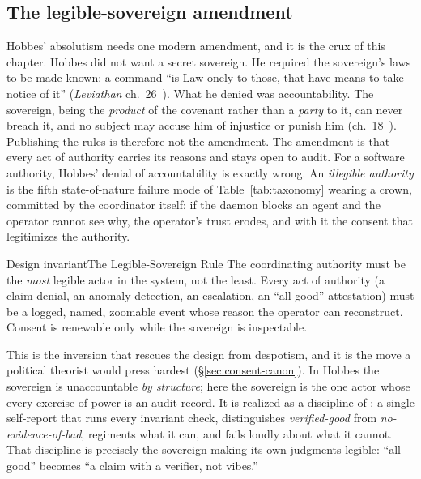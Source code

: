 \documentclass[11pt,a4paper]{article}
\theoremstyle{definition}
\theoremstyle{plain}
\begin{document}
\subsection{The legible-sovereign amendment}\label{sec:legible-sovereign}
Hobbes' absolutism needs one modern amendment, and it is the crux of this chapter.
Hobbes did not want a secret sovereign. He required the sovereign's laws to be made
known: a command ``is Law onely to those, that have means to take notice of it''
(\emph{Leviathan} ch.~26~). What he denied was accountability.
The sovereign, being the \emph{product} of the covenant rather than a
\emph{party} to it, can never breach it, and no subject may accuse him of
injustice or punish him (ch.~18~). Publishing the
rules is therefore not the amendment. The amendment is that every act of
authority carries its reasons and stays open to audit. For a software
authority, Hobbes' denial of accountability is exactly wrong. An \emph{illegible authority} is the fifth state-of-nature failure mode
of Table~\ref{tab:taxonomy} wearing a crown, committed by the coordinator itself: if the daemon blocks an agent and the
operator cannot see why, the operator's trust erodes, and with it the consent that
legitimizes the authority.
\begin{pdclaim}{Design invariant}{The Legible-Sovereign Rule}
\setlength{\parskip}{4pt plus 1pt}
\label{prop:legible-sovereign}
The coordinating authority must be the \emph{most} legible actor in the system, not
the least.
Every act of authority (a claim denial, an anomaly detection, an
escalation, an ``all good'' attestation) must be a logged, named, zoomable event
whose reason the operator can reconstruct.
Consent is renewable only while the
sovereign is inspectable.
\end{pdclaim}
This is the inversion that rescues the design from despotism, and it is the move a
political theorist would press hardest (\S\ref{sec:consent-canon}). In Hobbes the
sovereign is unaccountable \emph{by structure}; here the sovereign is the one actor whose
every exercise of power is an audit record. It is realized as a discipline of
: a single self-report that runs every invariant check,
distinguishes \emph{verified-good} from \emph{no-evidence-of-bad}, regiments what it
can, and fails loudly about what it cannot. That discipline is precisely the
sovereign making its own judgments legible: ``all good'' becomes ``a claim with a
verifier, not vibes.''
\end{document}
